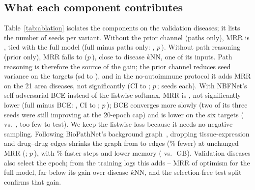 \documentclass{ieeeaccess}
\begin{document}
\subsection{What each component contributes}
\label{sec:aim3}
Table~\ref{tab:ablation} isolates the components on the validation diseases; it lists the number of seeds per variant. Without the prior channel (paths only), MRR is \PathsValidMrr{}, tied with the full model (full minus paths only: \DiffMainPathsValid, $p$\,\PwilMainPathsValid). Without path reasoning (prior only), MRR falls to \PriorValidMrr{} ($p$\,\PwilMainPriorValid), close to disease $k$NN, one of its inputs. Path reasoning is therefore the source of the gain; the prior channel reduces seed variance on the targets (sd \PathsTargetsMrrSd{} to \MainTargetsMrrSd), and in the no-autoimmune protocol it adds \DiffNoautoPathsArea{} MRR on the 21 area diseases, not significantly (CI \DiffLoNoautoPathsArea{} to \DiffHiNoautoPathsArea; $p$\,\PwilNoautoPathsArea; \NoautoPathsSeeds{} seeds each). With NBFNet's self-adversarial BCE instead of the listwise softmax, MRR is \BceValidMrr{}, not significantly lower (full minus BCE: \DiffMainBceValid, CI \DiffLoMainBceValid{} to \DiffHiMainBceValid; $p$\,\PwilMainBceValid); BCE converges more slowly (two of its three seeds were still improving at the 20-epoch cap) and is lower on the six targets (\BceTargetsMrr{} vs.\ \MainTargetsMrr, too few to test). We keep the listwise loss because it needs no negative sampling. Following BioPathNet's background graph~\cite{hu2026biopathnet}, dropping tissue-expression and drug--drug edges shrinks the graph from \EdgesMain{} to \EdgesBrg{} edges (\BrgEdgeCutPct\% fewer) at unchanged MRR (\BrgValidMrr; $p$\,\PwilMainBrgValid), with \BrgSpeedupPct\% faster steps and lower memory (\PeakMemBrg{} vs.\ \PeakMemMain\,GB). Validation diseases also select the epoch; from the training logs this adds \SelGapMainMin--\SelGapMainMax{} MRR of optimism for the full model, far below its gain over disease $k$NN, and the selection-free test split confirms that gain.

\begin{table}[!t]
\centering
\caption{Ablations on the 68 validation diseases (mean $\pm$ sd over 3 seeds each). Paths only: no prior channel; prior only: no path reasoning; BRG: background relation subset. $p$: two-sided Wilcoxon on paired validation MRR vs.\ the full model.}
\label{tab:ablation}
\scriptsize
\setlength{\tabcolsep}{2.5pt}

\end{table}
\end{document}
